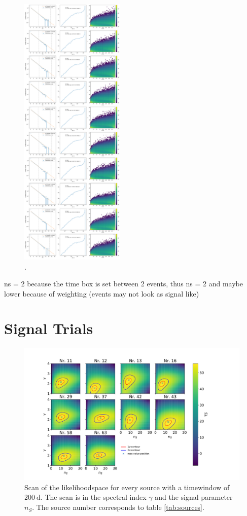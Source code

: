 \begin{figure}
    \centering
    \includegraphics[width=5cm]{Plots/05_csky/9_years_gfu_gold_time_dep_bg_timewindows_fixed_t0.pdf}
    \caption{.}
\end{figure}

ns = 2 because the time box is set between 2 events, thus ns = 2 and maybe lower because of weighting (events may not look as signal like)
\section{Signal Trials}

\begin{figure}
    \centering
    \includegraphics[width=\linewidth]{Plots/05_csky/llh_scan.pdf}
    \caption{Scan of the likelihoodspace for every source with a timewindow of $\SI{200}{\day}$. The scan is in the spectral index $\gamma$ and the signal parameter $n_S$. The source number corresponds to table \ref{tab:sources}.}
    \label{fig:llh_scan_time_dep}
\end{figure}

